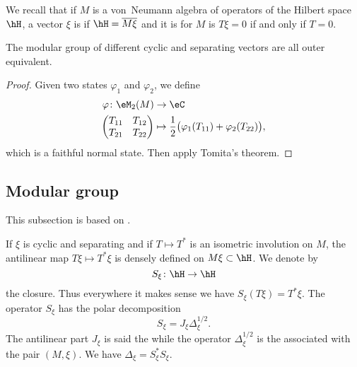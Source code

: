 We recall that if $M$ is a von~Neumann algebra of operators of the Hilbert space $\hH$, a vector $\xi$ is  if $\hH=\overline{ M\xi }$ and it is  for $M$ is $T\xi=0$ if and only if $T=0$.

\begin{theorem}
	The modular group of different cyclic and separating vectors are all outer equivalent.
\end{theorem}

\begin{proof}
	Given two states $\varphi_1$ and $\varphi_2$, we define
	\begin{equation}
		\begin{aligned}
			\varphi\colon \eM_2(M) & \to \eC                                                               \\
			\begin{pmatrix}
				T_{11} & T_{12} \\
				T_{21} & T_{22}
			\end{pmatrix}
			                       & \mapsto \frac{ 1 }{2}\big( \varphi_1(T_{11})+\varphi_2(T_{22}) \big),
		\end{aligned}
	\end{equation}
	which is a faithful normal state. Then apply Tomita's theorem.
\end{proof}

\subsection{Modular group}
This subsection is based on \cite{CirpianiDirichlet}.

If $\xi$ is cyclic and separating and if $T\mapsto T^*$ is an isometric involution on $M$, the antilinear map $T\xi\mapsto T^*\xi$ is densely defined on $M\xi\subset\hH$. We denote by
\begin{equation}
	S_{\xi}\colon \hH\to \hH
\end{equation}
the closure. Thus everywhere it makes sense we have $S_{\xi}(T\xi)=T^*\xi$. The operator $S_{\xi}$ has the polar decomposition
\begin{equation}
	S_{\xi}=J_{\xi}\Delta^{1/2}_{\xi}.
\end{equation}
The antilinear part $J_{\xi}$ is said the  while the operator $\Delta^{1/2}_{\xi}$ is the  associated with the pair $(M,\xi)$. We have $\Delta_{\xi}=S_{\xi}^*S_{\xi}$.

